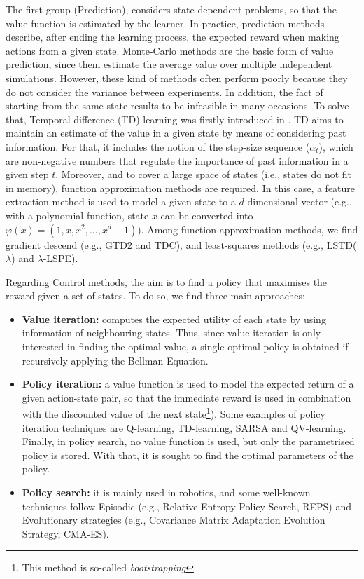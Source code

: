 \documentclass[12pt, a4paper,twoside]{tesi_upf}
\begin{document}
			The first group (Prediction), considers state-dependent problems, so that the value function is estimated by the learner. In practice, prediction methods describe, after ending the learning process, the expected reward when making actions from a given state. Monte-Carlo methods \cite{robert2004monte} are the basic form of value prediction, since them estimate the average value over multiple independent simulations. However, these kind of methods often perform poorly because they do not consider the variance between experiments. In addition, the fact of starting from the same state results to be infeasible in many occasions. To solve that, Temporal difference (TD) learning was firstly introduced in \cite{sutton1988learning}. TD aims to maintain an estimate of the value in a given state by means of considering past information. For that, it includes the notion of the step-size sequence ($\alpha_t$), which are non-negative numbers that regulate the importance of past information in a given step $t$. Moreover, and to cover a large space of states (i.e., states do not fit in memory), function approximation methods are required. In this case, a feature extraction method is used to model a given state to a $d$-dimensional vector (e.g., with a polynomial function, state $x$ can be converted into $\varphi(x) = (1, x, x^2, ..., x^d-1)$).  Among function approximation methods, we find gradient descend (e.g., GTD2 and TDC), and least-squares methods (e.g., LSTD($\lambda$) and $\lambda$-LSPE).
			
			Regarding Control methods, the aim is to find a policy that maximises the reward given a set of states. To do so, we find three main approaches: 
			\begin{itemize}
				\item \textbf{Value iteration:} computes the expected utility of each state by using information of neighbouring states. Thus, since value iteration is only interested in finding the optimal value, a single optimal policy is obtained if recursively applying the Bellman Equation.
				\item \textbf{Policy iteration:} a value function is used to model the expected return of a given action-state pair, so that the immediate reward is used in combination with the discounted value of the next state\footnote{This method is so-called \textit{bootstrapping}}). Some examples of policy iteration techniques are Q-learning, TD-learning, SARSA and QV-learning. Finally, in policy search, no value function is used, but only the parametrised policy is stored. With that, it is sought to find the optimal parameters of the policy.
				\item \textbf{Policy search:} it is mainly used in robotics, and some well-known techniques follow Episodic (e.g., Relative Entropy Policy Search, REPS) and Evolutionary strategies (e.g., Covariance Matrix Adaptation Evolution Strategy, CMA-ES).
			\end{itemize}   
		
\end{document}
